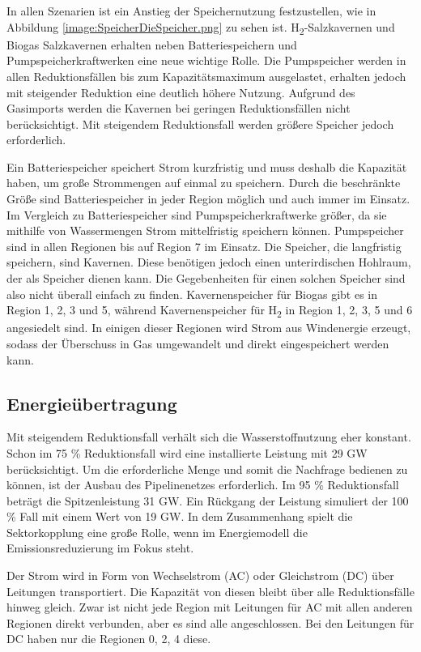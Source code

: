 In allen Szenarien ist ein Anstieg der Speichernutzung festzustellen, wie in Abbildung \ref{image:SpeicherDieSpeicher.png} zu sehen ist. H\textsubscript{2}-Salzkavernen und Biogas Salzkavernen erhalten neben Batteriespeichern und Pumpspeicherkraftwerken eine neue wichtige Rolle. Die Pumpspeicher werden in allen Reduktionsfällen bis zum Kapazitätsmaximum ausgelastet, erhalten jedoch mit steigender Reduktion eine deutlich höhere Nutzung. 
Aufgrund des Gasimports werden die Kavernen bei geringen Reduktionsfällen nicht berücksichtigt. Mit steigendem Reduktionsfall werden größere Speicher jedoch erforderlich.


Ein Batteriespeicher speichert Strom kurzfristig und muss deshalb die Kapazität haben, um große Strommengen auf einmal zu speichern. Durch die beschränkte Größe sind Batteriespeicher in jeder Region möglich und auch immer im Einsatz.
Im Vergleich zu Batteriespeicher sind Pumpspeicherkraftwerke größer, da sie mithilfe von Wassermengen Strom mittelfristig speichern können. Pumpspeicher sind in allen Regionen bis auf Region 7 im Einsatz.
Die Speicher, die langfristig speichern, sind Kavernen. Diese benötigen jedoch einen unterirdischen Hohlraum, der als Speicher dienen kann. Die Gegebenheiten für einen solchen Speicher sind also nicht überall einfach zu finden. Kavernenspeicher für Biogas gibt es in Region 1, 2, 3 und 5, während Kavernenspeicher für H\textsubscript{2} in Region 1, 2, 3, 5 und 6 angesiedelt sind. In einigen dieser Regionen wird Strom aus Windenergie erzeugt, sodass der Überschuss in Gas umgewandelt und direkt eingespeichert werden kann.


\subsection{Energieübertragung}
Mit steigendem Reduktionsfall verhält sich die Wasserstoffnutzung eher konstant. Schon im 75 \% Reduktionsfall wird eine installierte Leistung mit 29 GW berücksichtigt. Um die erforderliche Menge und somit die Nachfrage bedienen zu können, ist der Ausbau des Pipelinenetzes erforderlich. Im 95 \% Reduktionsfall beträgt die Spitzenleistung 31 GW. Ein Rückgang der Leistung simuliert der 100 \% Fall mit einem Wert von 19 GW. In dem Zusammenhang spielt die Sektorkopplung eine große Rolle, wenn im Energiemodell die Emissionsreduzierung im Fokus steht. 

Der Strom wird in Form von Wechselstrom (AC) oder Gleichstrom (DC) über Leitungen transportiert. Die Kapazität von diesen bleibt über alle Reduktionsfälle hinweg gleich. Zwar ist nicht jede Region mit Leitungen für AC mit allen anderen Regionen direkt verbunden, aber es sind alle angeschlossen. Bei den Leitungen für DC haben nur die Regionen 0, 2, 4 diese.

